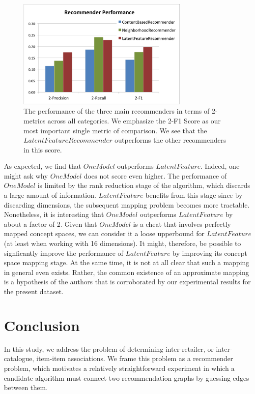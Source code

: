 \documentclass[11pt]{article}
\begin{document}
\begin{figure}[!htbp]
    \centering
    \includegraphics[width=0.75\textwidth]{RecommenderPerformance2.png}
	\caption{The performance of the three main recommenders in terms of
    2-metrics across all categories. We emphasize the 2-F1 Score as our most
    important single metric of comparison. We see that the $LatentFeatureRecommender$
    outperforms the other recommenders in this score.} 
    \label{fig:RecommenderPerformance} 
\end{figure}

As expected, we find that $OneModel$ outperforms $LatentFeature$. Indeed, one
might ask why $OneModel$ does not score even higher. The performance of
$OneModel$ is limited by the rank reduction stage of the algorithm, which
discards a large amount of information. $LatentFeature$ benefits from this stage
since by discarding dimensions, the subsequent mapping problem becomes more
tractable. Nonetheless, it is interesting that $OneModel$ outperforms
$LatentFeature$ by about a factor of 2. Given that $OneModel$ is a cheat that
involves perfectly mapped concept spaces, we can consider it a loose upperbound
for $LatentFeature$ (at least when working with 16 dimensions). It might,
therefore, be possible to signficantly improve the performance of
$LatentFeature$ by improving its concept space mapping stage.  At the same time,
it is not at all clear that such a mapping in general even exists. Rather, the
common existence of an approximate mapping is a hypothesis of the authors that
is corroborated by our experimental results for the present dataset.

\section*{Conclusion}
In this study, we address the problem of determining inter-retailer, or
inter-catalogue, item-item associations. We frame this problem as a recommender
problem, which motivates a relatively straightforward experiment in which a
candidate algorithm must connect two recommendation graphs by guessing edges
between them.
\end{document}
